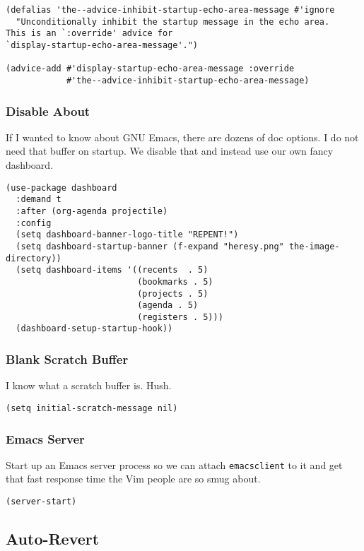 \documentclass[11pt]{article}
\begin{document}
\begin{verbatim}
(defalias 'the--advice-inhibit-startup-echo-area-message #'ignore
  "Unconditionally inhibit the startup message in the echo area.
This is an `:override' advice for
`display-startup-echo-area-message'.")

(advice-add #'display-startup-echo-area-message :override
            #'the--advice-inhibit-startup-echo-area-message)
\end{verbatim}

\subsubsection{Disable About}
\label{sec:org267b6fc}
If I wanted to know about GNU Emacs, there are dozens of doc
options. I do not need that buffer on startup. We disable that and
instead use our own fancy dashboard.

\begin{verbatim}
(use-package dashboard
  :demand t
  :after (org-agenda projectile)
  :config
  (setq dashboard-banner-logo-title "REPENT!")
  (setq dashboard-startup-banner (f-expand "heresy.png" the-image-directory))
  (setq dashboard-items '((recents  . 5)
                          (bookmarks . 5)
                          (projects . 5)
                          (agenda . 5)
                          (registers . 5)))
  (dashboard-setup-startup-hook))
\end{verbatim}

\subsubsection{Blank Scratch Buffer}
\label{sec:org22931ea}
I know what a scratch buffer is. Hush.
\begin{verbatim}
(setq initial-scratch-message nil)
\end{verbatim}

\subsubsection{Emacs Server}
\label{sec:org5de2c64}
Start up an Emacs server process so we can attach \texttt{emacsclient} to it
and get that fast response time the Vim people are so smug about.

\begin{verbatim}
(server-start)
\end{verbatim}
\subsection{Auto-Revert}
\label{sec:org91580f5}
\end{document}
